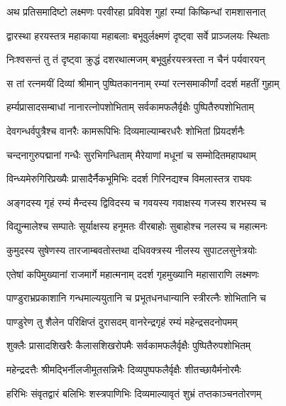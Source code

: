 
\twolineshloka
{अथ प्रतिसमादिष्टो लक्ष्मणः परवीरहा}
{प्रविवेश गुहां रम्यां किष्किन्धां रामशासनात्} %

\twolineshloka
{द्वारस्था हरयस्तत्र महाकाया महाबलाः}
{बभूवुर्लक्ष्मणं दृष्ट्वा सर्वे प्राञ्जलयः स्थिताः} %

\twolineshloka
{निःश्वसन्तं तु तं दृष्ट्वा क्रुद्धं दशरथात्मजम्}
{बभूवुर्हरयस्त्रस्ता न चैनं पर्यवारयन्} %

\twolineshloka
{स तां रत्नमयीं दिव्यां श्रीमान् पुष्पितकाननाम्}
{रम्यां रत्नसमाकीर्णां ददर्श महतीं गुहाम्} %

\twolineshloka
{हर्म्यप्रासादसम्बाधां नानारत्नोपशोभिताम्}
{सर्वकामफलैर्वृक्षैः पुष्पितैरुपशोभिताम्} %

\twolineshloka
{देवगन्धर्वपुत्रैश्च वानरैः कामरूपिभिः}
{दिव्यमाल्याम्बरधरैः शोभितां प्रियदर्शनैः} %

\twolineshloka
{चन्दनागुरुपद्मानां गन्धैः सुरभिगन्धिताम्}
{मैरेयाणां मधूनां च सम्मोदितमहापथाम्} %

\twolineshloka
{विन्ध्यमेरुगिरिप्रख्यैः प्रासादैर्नैकभूमिभिः}
{ददर्श गिरिनद्यश्च विमलास्तत्र राघवः} %

\twolineshloka
{अङ्गदस्य गृहं रम्यं मैन्दस्य द्विविदस्य च}
{गवयस्य गवाक्षस्य गजस्य शरभस्य च} %

\twolineshloka
{विद्युन्मालेश्च सम्पातेः सूर्याक्षस्य हनूमतः}
{वीरबाहोः सुबाहोश्च नलस्य च महात्मनः} %

\twolineshloka
{कुमुदस्य सुषेणस्य तारजाम्बवतोस्तथा}
{दधिवक्त्रस्य नीलस्य सुपाटलसुनेत्रयोः} %

\twolineshloka
{एतेषां कपिमुख्यानां राजमार्गे महात्मनाम्}
{ददर्श गृहमुख्यानि महासाराणि लक्ष्मणः} %

\twolineshloka
{पाण्डुराभ्रप्रकाशानि गन्धमाल्ययुतानि च}
{प्रभूतधनधान्यानि स्त्रीरत्नैः शोभितानि च} %

\twolineshloka
{पाण्डुरेण तु शैलेन परिक्षिप्तं दुरासदम्}
{वानरेन्द्रगृहं रम्यं महेन्द्रसदनोपमम्} %

\twolineshloka
{शुक्लैः प्रासादशिखरैः कैलासशिखरोपमैः}
{सर्वकामफलैर्वृक्षैः पुष्पितैरुपशोभितम्} %

\twolineshloka
{महेन्द्रदत्तैः श्रीमद्भिर्नीलजीमूतसन्निभैः}
{दिव्यपुष्पफलैर्वृक्षैः शीतच्छायैर्मनोरमैः} %

\twolineshloka
{हरिभिः संवृतद्वारं बलिभिः शस्त्रपाणिभिः}
{दिव्यमाल्यावृतं शुभ्रं तप्तकाञ्चनतोरणम्} %

